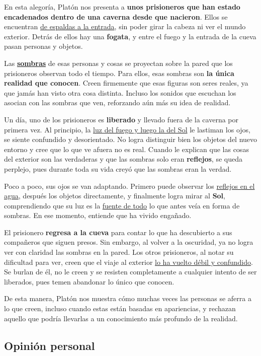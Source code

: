 \documentclass{article}
\begin{document}
En esta alegoría, Platón nos presenta a \textbf{unos prisioneros que han estado encadenados dentro de una caverna desde que nacieron}. Ellos se encuentran \underline{de espaldas a la entrada}, sin poder girar la cabeza ni ver el mundo exterior. Detrás de ellos hay una \textbf{fogata}, y entre el fuego y la entrada de la cueva pasan personas y objetos.

Las \underline{\textbf{sombras}} de esas personas y cosas se proyectan sobre la pared que los prisioneros observan todo el tiempo. Para ellos, esas sombras son \textbf{la única realidad que conocen}. Creen firmemente que esas figuras son seres reales, ya que jamás han visto otra cosa distinta. Incluso los sonidos que escuchan los asocian con las sombras que ven, reforzando aún más su idea de realidad.

Un día, uno de los prisioneros es \textbf{liberado} y llevado fuera de la caverna por primera vez. Al principio, la \underline{luz del fuego y luego la del Sol} le lastiman los ojos, se siente confundido y desorientado. No logra distinguir bien los objetos del nuevo entorno y cree que lo que ve afuera no es real. Cuando le explican que las cosas del exterior son las verdaderas y que las sombras solo eran \textbf{reflejos}, se queda perplejo, pues durante toda su vida creyó que las sombras eran la verdad.

Poco a poco, sus ojos se van adaptando. Primero puede observar los \underline{reflejos en el agua}, después los objetos directamente, y finalmente logra mirar al \textbf{Sol}, comprendiendo que su luz es la \underline{fuente de todo} lo que antes veía en forma de sombras. En ese momento, entiende que ha vivido engañado.

El prisionero \textbf{regresa a la cueva} para contar lo que ha descubierto a sus compañeros que siguen presos. Sin embargo, al volver a la oscuridad, ya no logra ver con claridad las sombras en la pared. Los otros prisioneros, al notar su dificultad para ver, creen que el viaje al exterior \underline{lo ha vuelto débil y confundido}. Se burlan de él, no le creen y se resisten completamente a cualquier intento de ser liberados, pues temen abandonar lo único que conocen.

De esta manera, Platón nos muestra cómo muchas veces las personas se aferra a lo que creen, incluso cuando estas están basadas en apariencias, y rechazan aquello que podría llevarlas a un conocimiento más profundo de la realidad.

\subsection*{\textcolor{trueblue}{\textbf{Opinión personal}}}
\end{document}
